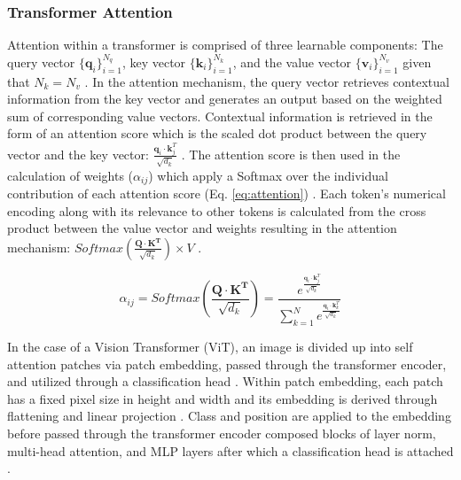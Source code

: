 \subsubsection{Transformer Attention}

Attention within a transformer is comprised of three learnable components: The
query vector $\{\textbf{q}_i\}^{N_q}_{i=1}$, key vector
$\{\textbf{k}_i\}^{N_k}_{i=1}$, and the value vector
$\{\textbf{v}_i\}^{N_v}_{i=1}$ given that $N_k = N_v$
\cite{bahdanau_neural_2016, vaswani_attention_2023, li_scalable_2024}. In the
attention mechanism, the query vector retrieves contextual information from the
key vector and generates an output based on the weighted sum of corresponding
value vectors. Contextual information is retrieved in the form of an attention
score which is the scaled dot product between the query vector and the key
vector: $\frac{\textbf{q}_i\cdot\textbf{k}_j^T}{\sqrt{d_k}}$
\cite{vaswani_attention_2023}. The attention score is then used in the
calculation of weights ($\alpha_{ij}$) which apply a Softmax over the individual
contribution of each attention score (Eq. \ref{eq:attention})
\cite{vaswani_attention_2023, bahdanau_neural_2016, li_scalable_2024}. Each
token's numerical encoding along with its relevance to other tokens is
calculated from the cross product between the value vector and weights resulting
in the attention mechanism: $Softmax\left(\frac {\textbf{Q} \cdot
\textbf{K}^\textbf{T}} {\sqrt{d_k}} \right)\times V$
\cite{vaswani_attention_2023, bahdanau_neural_2016, li_scalable_2024}.

\begin{equation}
\alpha_{ij} = Softmax\left(\frac {\textbf{Q} \cdot \textbf{K}^\textbf{T}}
{\sqrt{d_k}} \right) = \frac
{e^{\frac{\textbf{q}_i\cdot\textbf{k}_j^T}{\sqrt{d_k}}}}
{\sum^N_{k=1}e^{\frac{\textbf{q}_i\cdot\textbf{k}_k^T}{\sqrt{d_k}}}}
\label{eq:attention}
\end{equation}

In the case of a Vision Transformer (ViT), an image is divided up into self
attention patches via patch embedding, passed through the transformer encoder,
and utilized through a classification head \cite{dosovitskiy_image_2020,
arnab_vivit_2021}. Within patch embedding, each patch has a fixed pixel size in
height and width and its embedding is derived through flattening and linear
projection \cite{dosovitskiy_image_2020, arnab_vivit_2021}.  Class and position
are applied to the embedding before passed through the transformer encoder
composed blocks of layer norm, multi-head attention, and MLP layers after which
a classification head is attached \cite{dosovitskiy_image_2020}.

